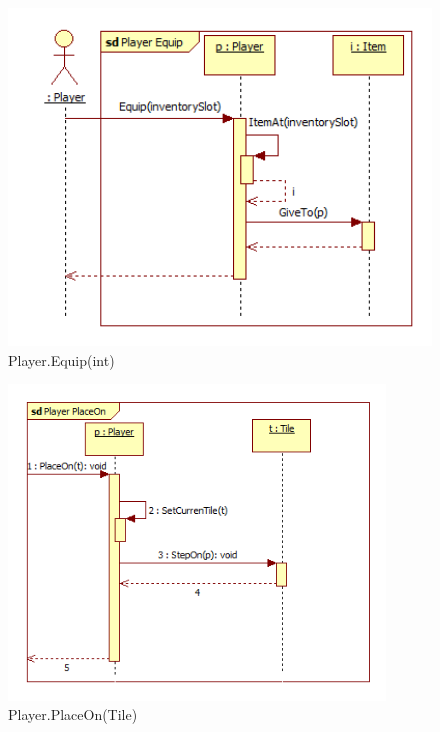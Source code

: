 \begin{figure}[H]
	\begin{center}
		\includegraphics[width=15cm]{chapters/chapter04/seqdiag/Player_Equip.png}
		\caption{Player.Equip(int)}
		\label{fig:PlayerEquip}
	\end{center}
\end{figure}
\begin{figure}[H]
	\begin{center}
		\includegraphics[width=10cm]{chapters/chapter04/seqdiag/Player_PlaceOn.png}
		\caption{Player.PlaceOn(Tile)}
		\label{fig:PlayerPlaceOn}
	\end{center}
\end{figure}
